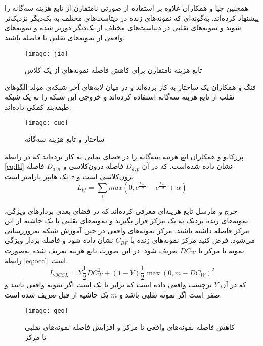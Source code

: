 همچنین جیا و همکاران
\cite{jia2020single}
 علاوه بر استفاده از  صورتی نامتقارن از تابع هزینه سه‌گانه را پیشنهاد کرده‌اند. به‌گونه‌ای که نمونه‌های زنده در دیتاست‌های مختلف به یک‌دیگر نزدیک‌تر شوند و نمونه‌های تقلبی در دیتاست‌های مختلف از یک‌دیگر دورتر شده و نمونه‌های واقعی از نمونه‌های تقلبی با فاصله باشند. 
 
 \begin{figure}[h]
 	\centerline{\texttt{[image: jia]}}
 	\caption{تابع هزینه نامتقارن برای کاهش فاصله نمونه‌های از یک کلاس \cite{jia2020single} }
 	\label{fig:jia}
 \end{figure}

فنگ و همکاران
\cite{feng2020learning}
یک ساختار 
\cite{ronneberger2015u}
به کار برده‌اند و در میان لایه‌های آخر شبکه‌ی مولد الگوهای تقلب از تابع هزینه سه‌گانه استفاده کرده‌اند و خروجی این شبکه  را به یک شبکه طبقه‌بند کمکی داده‌اند.

 \begin{figure}[h]
	\centerline{\texttt{[image: cue]}}
	\caption{ساختار  و تابع هزینه سه‌گانه \cite{feng2020learning} }
	\label{fig:cue}
\end{figure}

پرزکابو و همکاران
\cite{perez2019deep}
ابع هزینه سه‌گانه را در فضای نمایی به کار برده‌اند که در رابطه
\ref{eq:ltf}
نشان داده شده‌است. که در آن
$D_{a,p}$
فاصله درون‌کلاسی و
$D_{a,n}$
فاصله برون‌کلاسی است و
$\sigma$
یک هایپر پارامتر است.
 \begin{equation}\label{eq:ltf}
	L_{tf} = \sum_{i}{max(0,e^{\frac{D_{a,p}}{\sigma}}-e^{\frac{D_{a,n}}{\sigma}}+\alpha)}
\end{equation}

جرج و مارسل
\cite{george2020learning} 
 تابع هزینه‌ای معرفی کرده‌اند که در فضای  بعدی بردارهای ویژگی، نمونه‌های زنده نزدیک به یک مرکز قرار بگیرند و نمونه‌های تقلبی با یک حاشیه از این مرکز فاصله داشته باشند. مرکز نمونه‌های واقعی در حین آموزش شبکه به‌روزرسانی می‌شود.
فرض کنید مرکز نمونه‌های زنده با 
$C_{BF}$
 نشان داده شود و فاصله بردار ویژگی نمونه  با مرکز با 
$DC_W$ 
  تعریف شود. در این صورت تابع هزینه تعریف شده به‌صورت رابطه
\ref{eq:occl}
است.
 \begin{equation}\label{eq:occl}
L_{OCCL}=Y\frac{1}{2}DC^2_W+(1-Y)\frac{1}{2}\max(0,m-DC_W)^2
\end{equation}
که در آن $Y$ برچسب واقعی داده است که برابر با یک است اگر نمونه واقعی باشد و صفر است اگر نمونه تقلبی باشد و $m$ یک حاشیه از قبل تعریف شده است.
 \begin{figure}[h]
	\centerline{\texttt{[image: geo]}}
	\caption{کاهش فاصله نمونه‌های واقعی تا مرکز و افزایش فاصله نمونه‌های تقلبی تا مرکز \cite{george2020learning} }
	\label{fig:geo}
\end{figure}

